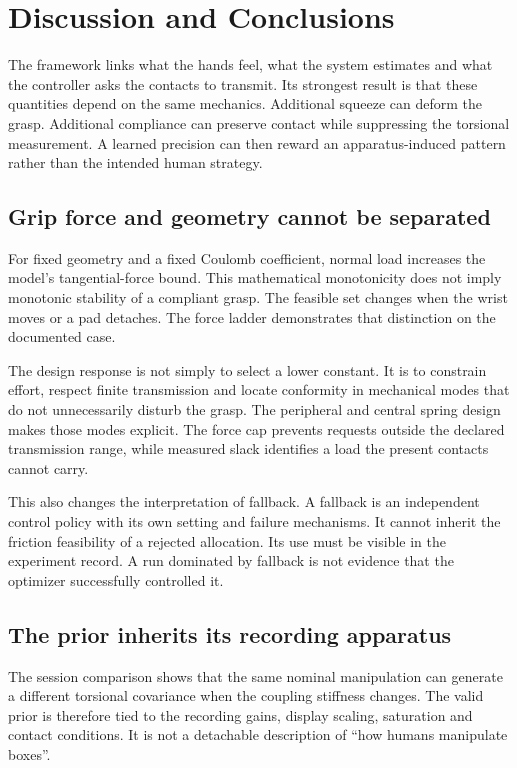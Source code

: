 \chapter{Discussion and Conclusions}
\label{ch:discussion}

The framework links what the hands feel, what the system estimates and what the controller asks the contacts to transmit. Its strongest result is that these quantities depend on the same mechanics. Additional squeeze can deform the grasp. Additional compliance can preserve contact while suppressing the torsional measurement. A learned precision can then reward an apparatus-induced pattern rather than the intended human strategy.

\section{Grip force and geometry cannot be separated}

For fixed geometry and a fixed Coulomb coefficient, normal load increases the model's tangential-force bound. This mathematical monotonicity does not imply monotonic stability of a compliant grasp. The feasible set changes when the wrist moves or a pad detaches. The force ladder demonstrates that distinction on the documented case.

The design response is not simply to select a lower constant. It is to constrain effort, respect finite transmission and locate conformity in mechanical modes that do not unnecessarily disturb the grasp. The peripheral and central spring design makes those modes explicit. The force cap prevents requests outside the declared transmission range, while measured slack identifies a load the present contacts cannot carry.

This also changes the interpretation of fallback. A fallback is an independent control policy with its own setting and failure mechanisms. It cannot inherit the friction feasibility of a rejected allocation. Its use must be visible in the experiment record. A run dominated by fallback is not evidence that the optimizer successfully controlled it.

\section{The prior inherits its recording apparatus}

The session comparison shows that the same nominal manipulation can generate a different torsional covariance when the coupling stiffness changes. The valid prior is therefore tied to the recording gains, display scaling, saturation and contact conditions. It is not a detachable description of ``how humans manipulate boxes''.

